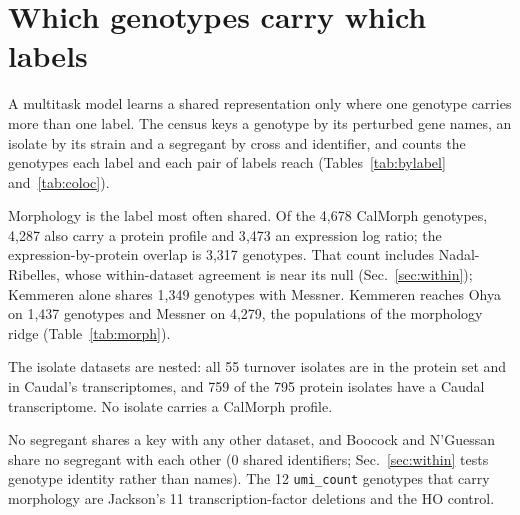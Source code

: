 
\section{Which genotypes carry which labels}
\label{sec:colocation}

A multitask model learns a shared representation only where one genotype carries more
than one label. The census keys a genotype by its perturbed gene names, an isolate by its
strain and a segregant by cross and identifier, and counts the genotypes each label and
each pair of labels reach (Tables~\ref{tab:bylabel} and~\ref{tab:coloc}).

\begin{table}[htbp]
\centering
\footnotesize
\begin{minipage}[t]{0.36\textwidth}\centering
\caption[]{\textbf{Genotypes per label.} Distinct genotype keys over every dataset
carrying the label; Vaishnav is not keyed by gene and is left out.}
\label{tab:bylabel}

\end{minipage}\hfill
\begin{minipage}[t]{0.6\textwidth}\centering
\caption[]{\textbf{Co-location.} Genotypes carrying both labels, in any datasets. A
label name can span datasets: \texttt{expression\_log2\_ratio} is Kemmeren, Sameith and
Nadal-Ribelles; \texttt{umi\_count} is Jackson, Boocock and N'Guessan;
\texttt{protein\_abundance} is Messner, Zelezniak and Muenzner.}
\label{tab:coloc}

\end{minipage}
\end{table}

Morphology is the label most often shared. Of the 4{,}678 CalMorph genotypes, 4{,}287
also carry a protein profile and 3{,}473 an expression log ratio; the
expression-by-protein overlap is 3{,}317 genotypes. That count includes Nadal-Ribelles,
whose within-dataset agreement is near its null (Sec.~\ref{sec:within}); Kemmeren alone
shares 1{,}349 genotypes with Messner. Kemmeren reaches Ohya on 1{,}437
genotypes and Messner on 4{,}279, the populations of the morphology ridge
(Table~\ref{tab:morph}).

The isolate datasets are nested: all 55 turnover isolates are in the protein set and in
Caudal's transcriptomes, and 759 of the 795 protein isolates have a Caudal
transcriptome. No isolate carries a CalMorph profile.

No segregant shares a key with any other dataset, and Boocock and N'Guessan share no
segregant with each other (0 shared identifiers; Sec.~\ref{sec:within} tests genotype
identity rather than names). The 12 \texttt{umi\_count} genotypes that carry morphology
are Jackson's 11 transcription-factor deletions and the HO control.

